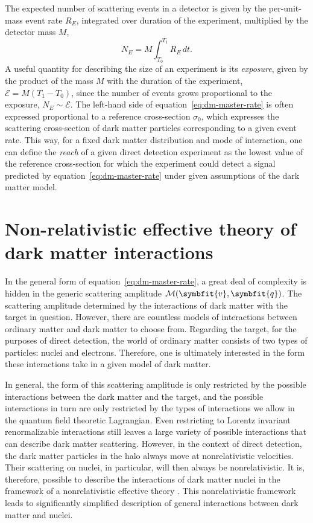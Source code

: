 \documentclass[b5paper, 10pt, twoside]{book}
\renewcommand{\vec}[1]{\symbfit{#1}}
\newcommand{\difd}{\,d}
\begin{document}
The expected number of scattering events in a detector is given by the per-unit-mass event rate $R_E$, integrated over duration of the experiment, multiplied by the detector mass $M$,
\begin{equation}
    N_E=M\int_{T_0}^{T_1} R_E\difd t.
\end{equation}
A useful quantity for describing the size of an experiment is its \emph{exposure}, given by the product of the mass $M$ with the duration of the experiment, $\mathcal{E}=M(T_1-T_0)$, since the number of events grows proportional to the exposure, $N_E\sim\mathcal{E}$. The left-hand side of equation~\eqref{eq:dm-master-rate} is often expressed proportional to a reference cross-section $\sigma_0$, which expresses the scattering cross-section of dark matter particles corresponding to a given event rate. This way, for a fixed dark matter distribution and mode of interaction, one can define the \emph{reach} of a given direct detection experiment as the lowest value of the reference cross-section for which the experiment could detect a signal predicted by equation~\eqref{eq:dm-master-rate} under given assumptions of the dark matter model.

\section{Non-relativistic effective theory of dark matter interactions}
\label{chap:eft}

In the general form of equation~\eqref{eq:dm-master-rate}, a great deal of complexity is hidden in the generic scattering amplitude $\mathcal{M}(\vec{v},\vec{q})$. The scattering amplitude determined by the interactions of dark matter with the target in question. However, there are countless models of interactions between ordinary matter and dark matter to choose from. Regarding the target, for the purposes of direct detection, the world of ordinary matter consists of two types of particles: nuclei and electrons. Therefore, one is ultimately interested in the form these interactions take in a given model of dark matter.

In general, the form of this scattering amplitude is only restricted by the possible interactions between the dark matter and the target, and the possible interactions in turn are only restricted by the types of interactions we allow in the quantum field theoretic Lagrangian. Even restricting to Lorentz invariant renormalizable interactions still leaves a large variety of possible interactions that can describe dark matter scattering. However, in the context of direct detection, the dark matter particles in the halo always move at nonrelativistic velocities. Their scattering on nuclei, in particular, will then always be nonrelativistic. It is, therefore, possible to describe the interactions of dark matter nuclei in the framework of a nonrelativistic effective theory \parencite{FitzpatrickEtAl2013}. This nonrelativistic framework leads to significantly simplified description of general interactions between dark matter and nuclei.
\end{document}
